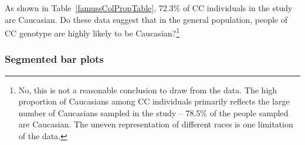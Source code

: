 \begin{exercise}
	As shown in Table~\ref{famussColPropTable}, 72.3\% of CC individuals in the study are Caucasian. Do these data suggest that in the general population, people of CC genotype are highly likely to be Caucasian?\footnote{No, this is not a reasonable conclusion to draw from the data. The high proportion of Caucasians among CC individuals primarily reflects the large number of Caucasians sampled in the study -- 78.5\% of the people sampled are Caucasian. The uneven representation of different races is one limitation of the  data.}
\end{exercise}

\subsubsection{Segmented bar plots}

